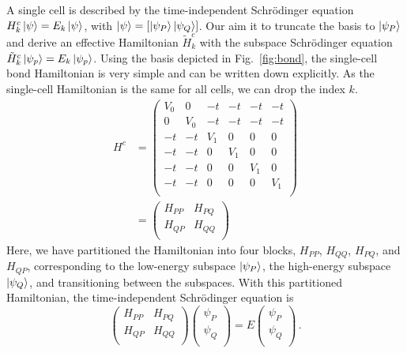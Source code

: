 A single  cell is described by the time-independent Schr\"odinger
equation $H^c_k \left|\psi\right> = E_k \left|\psi\right>$, with $\left|\psi\right> = \left[
\left|\psi_P\right> \left|\psi_Q\right> \right]$. Our aim it to truncate the basis to
$\left|\psi_P\right>$ and derive an effective Hamiltonian $\tilde{H}^c_k$ with the
subspace Schr\"odinger equation $\tilde{H}^c_k \left|\psi_p\right> = E_k \left|\psi_p\right>$.
Using the basis depicted in Fig.~\ref{fig:bond}, the single-cell bond
Hamiltonian is very simple and can be written down explicitly. As the
single-cell Hamiltonian is the same for all cells, we can drop the index $k$.
%
\begin{equation}
\begin{split}
  \label{eq:H_marix}
  H^c
  &=
  \left(
  \begin{array}{cc|cccc}
    V_0 & 0   & -t  & -t  & -t  & -t  \\
    0   & V_0 & -t  & -t  & -t  & -t  \\
    \hline
    -t  & -t  & V_1 & 0   & 0   & 0   \\
    -t  & -t  & 0   & V_1 & 0   & 0   \\
    -t  & -t  & 0   & 0   & V_1 & 0   \\
    -t  & -t  & 0   & 0   & 0   & V_1 \\
  \end{array}
  \right) \\[1em]
  &=
  \left(
  \begin{array}{cc}
    H_{PP} & H_{PQ} \\
    H_{QP} & H_{QQ} \\
  \end{array}
  \right)
\end{split}
\end{equation}
%
Here, we have partitioned the Hamiltonian into four blocks, $H_{PP}$, $H_{QQ}$,
$H_{PQ}$, and $H_{QP}$, corresponding to the low-energy subspace $\left|\psi_P\right>$,
the high-energy subspace $\left|\psi_Q\right>$, and transitioning between the subspaces.
With this partitioned Hamiltonian, the time-independent Schr\"odinger equation is
%
\begin{equation}
  \label{eq:SE}
  \begin{pmatrix}
    H_{PP} & H_{PQ} \\
    H_{QP} & H_{QQ} \\
  \end{pmatrix}
  \begin{pmatrix}
    \psi_P \\
    \psi_Q \\
  \end{pmatrix}
  =
  E
  \begin{pmatrix}
    \psi_P \\
    \psi_Q \\
  \end{pmatrix}
  \, .
\end{equation}
